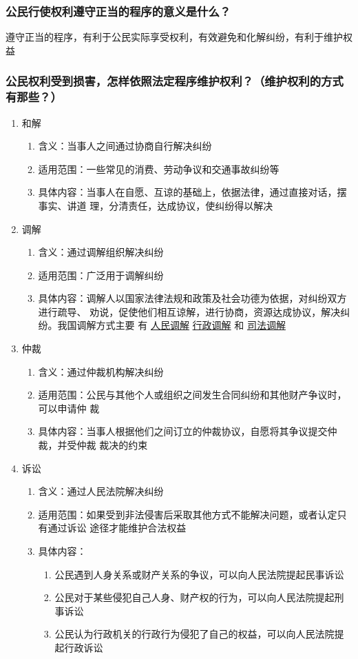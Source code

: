 \documentclass[11pt]{article}
\begin{document}
\subsubsection{公民行使权利遵守正当的程序的意义是什么？}
\label{sec:org653403c}
遵守正当的程序，有利于公民实际享受权利，有效避免和化解纠纷，有利于维护权益
\subsubsection{公民权利受到损害，怎样依照法定程序维护权利？（维护权利的方式有那些？）}
\label{sec:org367cee7}
\begin{enumerate}
\item 和解
\begin{enumerate}
\item 含义：当事人之间通过协商自行解决纠纷
\item 适用范围：一些常见的消费、劳动争议和交通事故纠纷等
\item 具体内容：当事人在自愿、互谅的基础上，依据法律，通过直接对话，摆事实、讲道
理，分清责任，达成协议，使纠纷得以解决
\end{enumerate}
\item 调解
\begin{enumerate}
\item 含义：通过调解组织解决纠纷
\item 适用范围：广泛用于调解纠纷
\item 具体内容：调解人以国家法律法规和政策及社会功德为依据，对纠纷双方进行疏导、
劝说，促使他们相互谅解，进行协商，资源达成协议，解决纠纷。我国调解方式主要
有 \uline{人民调解} \uline{行政调解} 和 \uline{司法调解}
\end{enumerate}
\item 仲裁
\begin{enumerate}
\item 含义：通过仲裁机构解决纠纷
\item 适用范围：公民与其他个人或组织之间发生合同纠纷和其他财产争议时，可以申请仲
裁
\item 具体内容：当事人根据他们之间订立的仲裁协议，自愿将其争议提交仲裁，并受仲裁
裁决的约束
\end{enumerate}
\item 诉讼
\begin{enumerate}
\item 含义：通过人民法院解决纠纷
\item 适用范围：如果受到非法侵害后采取其他方式不能解决问题，或者认定只有通过诉讼
途径才能维护合法权益
\item 具体内容：
\begin{enumerate}
\item 公民遇到人身关系或财产关系的争议，可以向人民法院提起民事诉讼
\item 公民对于某些侵犯自己人身、财产权的行为，可以向人民法院提起刑事诉讼
\item 公民认为行政机关的行政行为侵犯了自己的权益，可以向人民法院提起行政诉讼
\end{enumerate}
\end{enumerate}
\end{enumerate}
\end{document}
